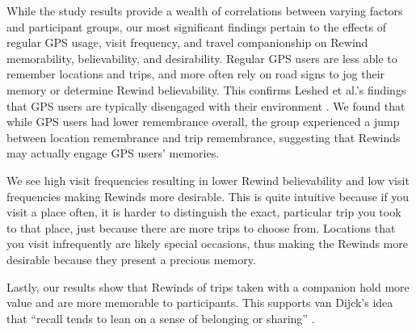 \documentclass{sigchi}
\begin{document}
While the study results provide a wealth of correlations between varying factors and participant groups, our most significant findings pertain to the effects of regular GPS usage, visit frequency, and travel companionship on Rewind memorability, believability, and desirability. Regular GPS users are less able to remember locations and trips, and more often rely on road signs to jog their memory or determine Rewind believability. This confirms Leshed et al.'s findings that GPS users are typically disengaged with their environment \cite{leshed2008car}. We found that while GPS users had lower remembrance overall, the group experienced a jump between location remembrance and trip remembrance, suggesting that Rewinds may actually engage GPS users' memories. 

We see high visit frequencies resulting in lower Rewind believability and low visit frequencies making Rewinds more desirable. This is quite intuitive because if you visit a place often, it is harder to distinguish the exact, particular trip you took to that place, just because there are more trips to choose from. Locations that you visit infrequently are likely special occasions, thus making the Rewinds more desirable because they present a precious memory.

Lastly, our results show that Rewinds of trips taken with a companion hold more value and are more memorable to participants. This supports van Dijck's idea that ``recall tends to lean on a sense of belonging or sharing'' \cite{van2007mediated}.

		

\end{document}
